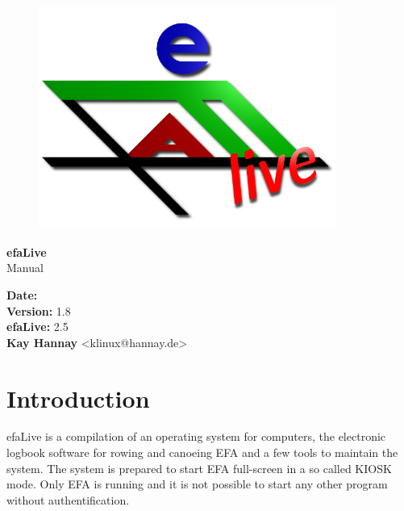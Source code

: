 \documentclass[a4paper,12pt,twoside]{article}
\title{\Title}
\author{\Author}
\date{\DocDate}
\begin{document}

\begin{titlepage}
    \vspace*{1cm}
    \begin{center}
        \begin{figure}
            \centering
            \includegraphics[width=9.745cm,height=7.308cm]{screenshots/efaLiveen-img1.png}
        \end{figure}
        \Huge
        \textbf{efaLive} \\[0.1cm]
        \LARGE
        Manual \\[5cm]
    \end{center}
    \normalsize
    \vspace*{4cm}
    \textbf{Date:} {\DocDate} \\
    \textbf{Version:} 1.8 \\
    \textbf{efaLive:} 2.5 \\
    \textbf{Kay Hannay} <klinux@hannay.de> \\
\end{titlepage}


\tableofcontents
\clearpage\setcounter{page}{1}
\section{Introduction}
efaLive is a compilation of an operating system for computers, the electronic
logbook software for rowing and canoeing EFA and a few tools to maintain the 
system. The system is prepared to start EFA full-screen in a so called KIOSK 
mode. Only EFA is running and it is not possible to start any other program 
without authentification.
\end{document}
